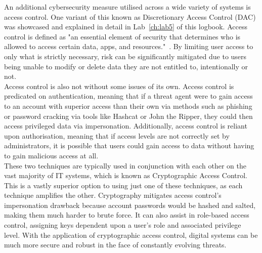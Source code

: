 \documentclass[12pt]{report}
\begin{document}
    \noindent An additional cybersecurity measure utilised across a wide variety of systems is access control.
    One variant of this known as Discretionary Access Control (DAC) was showcased and explained in detail
    in Lab~\ref{ch:lab5} of this logbook.
    Access control is defined as "an essential element of security that determines who is allowed to
    access certain data, apps, and resources."~\autocite{AccessControlMS}.
    By limiting user access to only what is strictly necessary, risk can be significantly mitigated due to
    users being unable to modify or delete data they are not entitled to, intentionally or not.\\

    \noindent Access control is also not without some issues of its own.
    Access control is predicated on authentication, meaning that if a threat agent were to gain access to an account
    with superior access than their own via methods such as phishing or password cracking via tools like Hashcat or
    John the Ripper, they could then access privileged data via impersonation.
    Additionally, access control is reliant upon authorisation, meaning that if access levels are not correctly
    set by administrators, it is possible that users could gain access to data without having to gain malicious
    access at all.\\

    \noindent These two techniques are typically used in conjunction with each other on the vast majority of
    IT systems, which is known as Cryptographic Access Control.
    This is a vastly superior option to using just one of these techniques, as each technique amplifies the other.
    Cryptography mitigates access control's impersonation drawback because account passwords
    would be hashed and salted, making them much harder to brute force.
    It can also assist in role-based access control, assigning keys dependent upon a user's role
    and associated privilege level.
    With the application of cryptographic access control, digital systems can be much more secure and robust
    in the face of constantly evolving threats.


    \printbibliography
\end{document}
